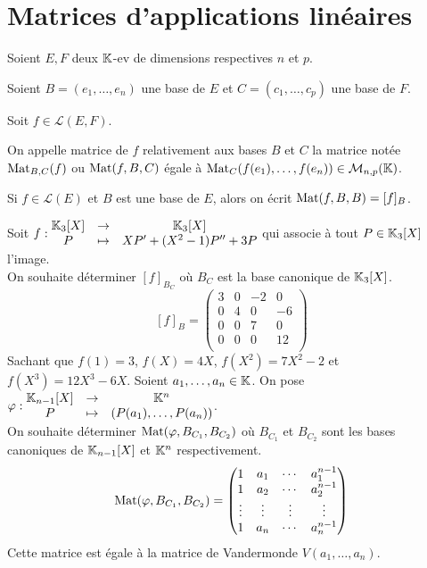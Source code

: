 \documentclass[12pt, a4paper]{report}
\begin{document}
\section{Matrices d'applications linéaires}

\begin{definition}
    Soient $E,F$ deux $\mathbb{K}$-ev de dimensions respectives $n$ et $p$.
    
    Soient $B = (e_1,\dots,e_n)$ une base de $E$ et $C = (c_1,\dots,c_p)$ une base de $F$.

    Soit $f \in \mathcal L(E,F)$.

    On appelle matrice de $f$ relativement aux bases $B$ et $C$ la matrice notée $\mathrm{Mat}_{B,C}(f)$ ou $\mathrm{Mat}(f,B,C)$ égale à $\mathrm{Mat}_C(f(e_1),\dots,f(e_n)) \in \mathcal M_{n,p}(\mathbb{K})$.
\end{definition}

\begin{remark}
    Si $f \in \mathcal L(E)$ et $B$ est une base de $E$, alors on écrit $\mathrm{Mat}(f,B,B)=[f]_B$. 
\end{remark}

\begin{example}
    \begin{outline}
        \1 Soit $f : \begin{matrix} \mathbb{K}_3[X] &\to &\mathbb{K}_3[X] \\ P &\mapsto &XP'+(X^2-1)P'' + 3P \end{matrix}$ qui associe à tout $P \in \mathbb{K}_3[X]$ l'image.\\On souhaite déterminer $[f]_{B_C}$ où $B_C$ est la base canonique de $\mathbb{K}_3[X]$.
        $$[f]_B = \left(\begin{matrix}
        3 & 0 & -2 & 0 \\
        0 & 4 & 0 & -6 \\
        0 & 0 & 7 & 0 \\
        0 & 0 & 0 & 12 \\
        \end{matrix}\right)$$
        Sachant que $f(1) = 3$, $f(X) = 4X$, $f(X^2) = 7X^2 - 2$ et $f(X^3) = 12X^3 - 6X$.
        \1 Soient $a_1,\dots,a_n \in \mathbb{K}$. On pose $\varphi : \begin{matrix} \mathbb{K}_{n-1}[X] &\to &\mathbb{K}^n \\ P &\mapsto &(P(a_1),\dots,P(a_n)) \end{matrix}$.\\On souhaite déterminer $\mathrm{Mat}(\varphi,B_{C_1},B_{C_2})$ où $B_{C_1}$ et $B_{C_2}$ sont les bases canoniques de $\mathbb{K}_{n-1}[X]$ et $\mathbb{K}^n$ respectivement.
        $$\mathrm{Mat}(\varphi,B_{C_1},B_{C_2}) = \left(\begin{matrix}
        1 & a_1 & \cdots & a_1^{n-1}\\
        1 & a_2 & \cdots & a_2^{n-1}\\
        \vdots & \vdots & \vdots & \vdots \\
        1 & a_n & \cdots & a_n^{n-1}
        \end{matrix}\right)$$
        Cette matrice est égale à la matrice de Vandermonde $V(a_1,\dots,a_n)$.
    \end{outline}
\end{example}
\end{document}
